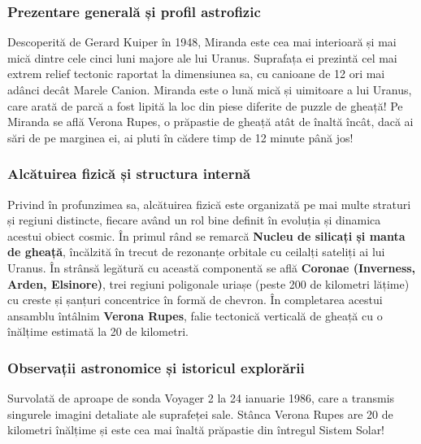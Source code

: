 \subsubsection*{Prezentare generală și profil astrofizic}
Descoperită de Gerard Kuiper în 1948, Miranda este cea mai interioară și mai mică dintre cele cinci luni majore ale lui Uranus. Suprafața ei prezintă cel mai extrem relief tectonic raportat la dimensiunea sa, cu canioane de 12 ori mai adânci decât Marele Canion. Miranda este o lună mică și uimitoare a lui Uranus, care arată de parcă a fost lipită la loc din piese diferite de puzzle de gheață! Pe Miranda se află Verona Rupes, o prăpastie de gheață atât de înaltă încât, dacă ai sări de pe marginea ei, ai pluti în cădere timp de 12 minute până jos!

\subsubsection*{Alcătuirea fizică și structura internă}
Privind în profunzimea sa, alcătuirea fizică este organizată pe mai multe straturi și regiuni distincte, fiecare având un rol bine definit în evoluția și dinamica acestui obiect cosmic. În primul rând se remarcă \textbf{Nucleu de silicați și manta de gheață}, încălzită în trecut de rezonanțe orbitale cu ceilalți sateliți ai lui Uranus. În strânsă legătură cu această componentă se află \textbf{Coronae (Inverness, Arden, Elsinore)}, trei regiuni poligonale uriașe (peste 200 de kilometri lățime) cu creste și șanțuri concentrice în formă de chevron. În completarea acestui ansamblu întâlnim \textbf{Verona Rupes}, falie tectonică verticală de gheață cu o înălțime estimată la 20 de kilometri.

\subsubsection*{Observații astronomice și istoricul explorării}
Survolată de aproape de sonda Voyager 2 la 24 ianuarie 1986, care a transmis singurele imagini detaliate ale suprafeței sale. Stânca Verona Rupes are 20 de kilometri înălțime și este cea mai înaltă prăpastie din întregul Sistem Solar!

